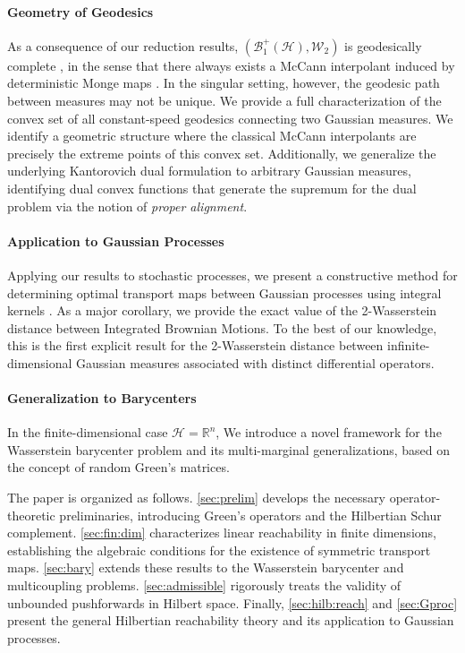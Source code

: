 \documentclass[noinfoline]{imsart}\setcounter{tocdepth}{2}
\renewcommand{\b}[1]{\mathbb{#1}} %
\renewcommand{\c}[1]{\mathcal{#1}} %
\theoremstyle{plain}
\begin{document}
\paragraph{Geometry of Geodesics} 
As a consequence of our reduction results, $(\c{B}_{1}^{+}(\c{H}), \c{W}_{2})$ is geodesically complete \cite{lee2018introduction}, in the sense that there always exists a McCann interpolant induced by deterministic Monge maps \cite{mccann1997convexity}.
In the singular setting, however, the geodesic path between measures may not be unique. We provide a full characterization of the convex set of all constant-speed geodesics connecting two Gaussian measures. We identify a geometric structure where the classical McCann interpolants are precisely the extreme points of this convex set. Additionally, we generalize the underlying Kantorovich dual formulation \cite{brenier1991polar, cuesta1989notes, knott1984optimal, ruschendorf1990characterization} to arbitrary Gaussian measures, identifying dual convex functions that generate the supremum for the dual problem via the notion of \emph{proper alignment}.

\paragraph{Application to Gaussian Processes}
Applying our results to stochastic processes, we present a constructive method for determining optimal transport maps between Gaussian processes using integral kernels \cite{kallenberg1997foundations, da2006introduction}. As a major corollary, we provide the exact value of the 2-Wasserstein distance between Integrated Brownian Motions. To the best of our knowledge, this is the first explicit result for the 2-Wasserstein distance between infinite-dimensional Gaussian measures associated with distinct differential operators.

\paragraph{Generalization to Barycenters} 
In the finite-dimensional case $\c{H} = \b{R}^{n}$, We introduce a novel framework for the Wasserstein barycenter problem \cite{agueh2011barycenters, alvarez2016fixed, zemel2019frechet} and its multi-marginal generalizations, based on the concept of random Green's matrices.

\medskip
The paper is organized as follows. \cref{sec:prelim} develops the necessary operator-theoretic preliminaries, introducing Green’s operators and the Hilbertian Schur complement. \cref{sec:fin:dim} characterizes linear reachability in finite dimensions, establishing the algebraic conditions for the existence of symmetric transport maps. \cref{sec:bary} extends these results to the Wasserstein barycenter and multicoupling problems. \cref{sec:admissible} rigorously treats the validity of unbounded pushforwards in Hilbert space. Finally, \cref{sec:hilb:reach} and \cref{sec:Gproc} present the general Hilbertian reachability theory and its application to Gaussian processes.
\end{document}
